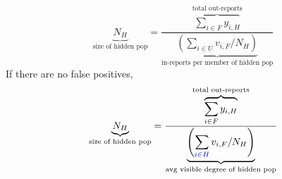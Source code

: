 \documentclass[aspectratio=169]{beamer}
\begin{document}
\begin{frame}

\end{frame}
\begin{frame}

\begin{equation*}
\underbrace{N_H}_{\text{size of hidden pop}} = \frac{ \overbrace{ \sum_{i \in F} y_{i,H} }^{\text{total out-reports}} } { \underbrace{ \left( \sum_{i \in U} v_{i,F} / N_H \right) }_{\text{in-reports per member of hidden pop}} }
\end{equation*}
\pause
\vfill
If there are no false positives,
\begin{equation*}
\underbrace{N_H}_{\text{size of hidden pop}} = \frac{ \overbrace{ \sum_{i \in F} y_{i,H} }^{\text{total out-reports}} } { \underbrace{ \left( \sum_{\textcolor{blue}{i \in H}} v_{i,F} / N_H \right) }_{\text{avg visible degree of hidden pop}} }
\end{equation*}

\end{frame}
\end{document}
